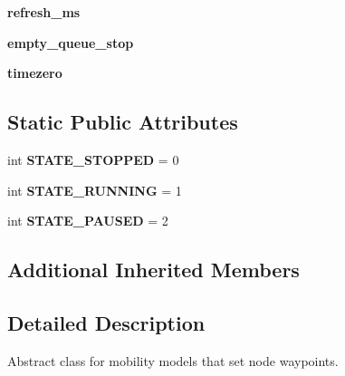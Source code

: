 \begin{DoxyCompactItemize}
\item 
\hypertarget{classcore_1_1mobility_1_1_way_point_mobility_a807757e3efc2507ac0308945093ab0e5}{{\bfseries refresh\+\_\+ms}}\label{classcore_1_1mobility_1_1_way_point_mobility_a807757e3efc2507ac0308945093ab0e5}

\item 
\hypertarget{classcore_1_1mobility_1_1_way_point_mobility_a60fbca651ddf9254756f3129d2c90fc0}{{\bfseries empty\+\_\+queue\+\_\+stop}}\label{classcore_1_1mobility_1_1_way_point_mobility_a60fbca651ddf9254756f3129d2c90fc0}

\item 
\hypertarget{classcore_1_1mobility_1_1_way_point_mobility_a2a7321524eed727935d9a823e69a330e}{{\bfseries timezero}}\label{classcore_1_1mobility_1_1_way_point_mobility_a2a7321524eed727935d9a823e69a330e}

\end{DoxyCompactItemize}
\subsection*{Static Public Attributes}
\begin{DoxyCompactItemize}
\item 
\hypertarget{classcore_1_1mobility_1_1_way_point_mobility_a5fe134c0487d12ad20a753165ca561e7}{int {\bfseries S\+T\+A\+T\+E\+\_\+\+S\+T\+O\+P\+P\+E\+D} = 0}\label{classcore_1_1mobility_1_1_way_point_mobility_a5fe134c0487d12ad20a753165ca561e7}

\item 
\hypertarget{classcore_1_1mobility_1_1_way_point_mobility_af5c9171d9b6af0aa903198ae14b5f145}{int {\bfseries S\+T\+A\+T\+E\+\_\+\+R\+U\+N\+N\+I\+N\+G} = 1}\label{classcore_1_1mobility_1_1_way_point_mobility_af5c9171d9b6af0aa903198ae14b5f145}

\item 
\hypertarget{classcore_1_1mobility_1_1_way_point_mobility_a2d360380b18f8795a3afde19601e3880}{int {\bfseries S\+T\+A\+T\+E\+\_\+\+P\+A\+U\+S\+E\+D} = 2}\label{classcore_1_1mobility_1_1_way_point_mobility_a2d360380b18f8795a3afde19601e3880}

\end{DoxyCompactItemize}
\subsection*{Additional Inherited Members}


\subsection{Detailed Description}
\begin{DoxyVerb}Abstract class for mobility models that set node waypoints.
\end{DoxyVerb}
 

